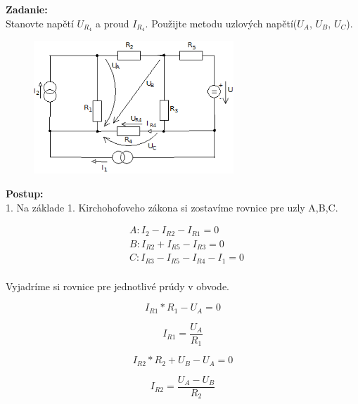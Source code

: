 \documentclass[a4paper,12pt]{article}
\begin{document}
\begin{flushleft}
\textbf{Zadanie:}\\
Stanovte napětí $U_{R_4}$ a proud $I_{R_4}$. Použijte metodu uzlových napětí($U_A$, $U_B$, $U_C$).
\end{flushleft}

\begin{figure}[!h]
  \centering
  \includegraphics[height=5cm]{obrazky/pr3a}
\end{figure}

\begin{flushleft}
\textbf{Postup:} \\ 
1. Na základe 1. Kirchohofoveho zákona si zostavíme rovnice pre uzly A,B,C. \\
\end{flushleft}

\begin{align*}
&A: I_2-I_{R2}- I_{R1} = 0\\
&B: I_{R2}+I_{R5}-I_{R3} = 0\\
&C: I_{R3}-I_{R5}-I_{R4}-I_1 = 0\\
\end{align*}

\begin{flushleft}
Vyjadríme si rovnice pre jednotlivé prúdy v obvode.
\end{flushleft}

\begin{equation*}
I_{R1}*R_1 - U_A = 0 
\end{equation*}

\begin{equation*}
I_{R1} = \frac{U_A}{R_1} 
\end{equation*}

\begin{equation*}
I_{R2}*R_2 + U_B - U_A = 0 
\end{equation*}

\begin{equation*}
I_{R2} = \frac{U_A-U_B}{R_2}
\end{equation*}
\end{document}
